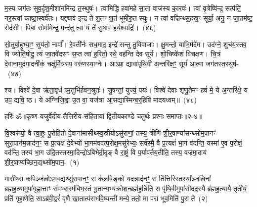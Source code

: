 म॒स्य जग॑तः सुव॒र्दृश॒मीशा॑नमिन्द्र त॒स्थुषः॑। त्वामिद्धि हवा॑महे सा॒ता वाज॑स्य का॒रवः॑। त्वां वृ॒त्रेष्वि॑न्द्र॒ सत्प॑तिं॒ नर॒स्त्वां काष्ठा॒स्वर्व॑तः। यद्द्याव॑ इन्द्र ते श॒तꣳ श॒तं भूमी॑रु॒त स्युः। न त्वा॑ वज्रिन्थ्स॒हस्र॒ꣳ॒ सूर्या॒ अनु॒ न जा॒तम॑ष्ट॒ रोद॑सी। पिबा॒ सोम॑मिन्द्र॒ मन्द॑तु त्वा॒ यं ते॑ सु॒षाव॑ हर्य॒श्वाद्रिः॑।~(४६)

सो॒तुर्बा॒हुभ्या॒ꣳ॒ सुय॑तो॒ नार्वा᳚। रे॒वती᳚र्नः सध॒माद॒ इन्द्रे॑ सन्तु तु॒विवा॑जाः। क्षु॒मन्तो॒ याभि॒र्मदे॑म। उद॑ग्ने॒ शुच॑य॒स्तव॒ वि ज्योति॒षोदु॒ त्यं जा॒तवे॑दसꣳ स॒प्त त्वा॑ ह॒रितो॒ रथे॒ वह॑न्ति देव सूर्य। शो॒चिष्के॑शं विचक्षण। चि॒त्रं दे॒वाना॒मुद॑गा॒दनी॑कं॒ चक्षु॑र्मि॒त्रस्य॒ वरु॑णस्या॒ग्नेः। आ\-ऽप्रा॒ द्यावा॑\-पृथि॒वी अ॒न्तरि॑क्ष॒ꣳ॒ सूर्य॑ आ॒त्मा जग॑तस्त॒स्थुष॑-~(४७)

श्च। विश्वे॑ दे॒वा ऋ॑ता॒वृध॑ ऋ॒तुभि॑र्\mbox{}हवन॒श्रुतः॑। जु॒षन्तां॒ युज्यं॒ पयः॑। विश्वे॑ देवाः शृणु॒तेमꣳ हवं॑ मे॒ ये अ॒न्तरि॑क्षे॒ य उप॒ द्यवि॒ ष्ठ। ये अ॑ग्निजि॒ह्वा उ॒त वा॒ यज॑त्रा आ॒सद्या॒स्मिन्ब॒र्॒\mbox{}हिषि॑ मादयध्वम्॥~(४८)

{\anuvakamend[{तदीशा॑न॒मद्रि॑स्त॒स्थुष॑स्त्रि॒ꣳ॒शच्च॑}]}%

{हरिः॑ ॐ}{॥कृष्ण-यजुर्वेदीय-तैत्तिरीय-संहितायां द्वितीयकाण्डे चतुर्थः प्रश्नः समाप्तः॥२-४॥}

\setcounter{anuvakam}{0}
वि॒श्वरू॑पो॒ वै त्वा॒ष्ट्रः पु॒रोहि॑तो दे॒वाना॑मासीथ्स्व॒स्रीयो\-ऽसु॑राणां॒ तस्य॒ त्रीणि॑ शी॒र्॒\mbox{}षाण्या॑सन्थ्सोम॒पानꣳ॑ सुरा॒पान॑म॒न्नाद॑न॒ꣳ॒ स प्र॒त्यक्षं॑ दे॒वेभ्यो॑ भा॒गम॑वदत्प॒रोक्ष॒मसु॑रेभ्यः॒ सर्व॑स्मै॒ वै प्र॒त्यक्षं॑ भा॒गं व॑दन्ति॒ यस्मा॑ ए॒व प॒रोक्षं॒ वद॑न्ति॒ तस्य॑ भा॒ग उ॑दि॒तस्तस्मा॒दिन्द्रो॑\-ऽबिभेदी॒दृङ् वै रा॒ष्ट्रं वि प॒र्याव॑र्तय॒तीति॒ तस्य॒ वज्र॑मा॒दाय॑ शी॒र्॒\mbox{}षाण्य॑च्छिन॒द्यथ्सो॑म॒पान॒-~(१)

मासी॒थ्स क॒पिञ्ज॑लो\-ऽभव॒द्यथ्सु॑रा॒पान॒ꣳ॒ स क॑ल॒विङ्को॒ यद॒न्नाद॑न॒ꣳ॒ स ति॑त्ति॒रिस्तस्या᳚\-ञ्ज॒लिना᳚ ब्रह्म\-ह॒त्यामुपा॑गृह्णा॒त्ताꣳ सं॑वथ्स॒रम॑बिभ॒स्तं भू॒तान्य॒भ्य॑क्रोश॒न्ब्रह्म॑ह॒न्निति॒ स पृ॑थि॒वीमुपा॑सीद\-द॒स्यै ब्र॑ह्मह॒त्यायै॒ तृती॑यं॒ प्रति॑ गृहा॒णेति॒ सा\-ऽब्र॑वी॒द्वरं॑ वृणै खा॒तात्प॑रा\-भवि॒ष्यन्ती॑ मन्ये॒ ततो॒ मा परा॑ भूव॒मिति॑ पु॒रा ते॑~(२)

